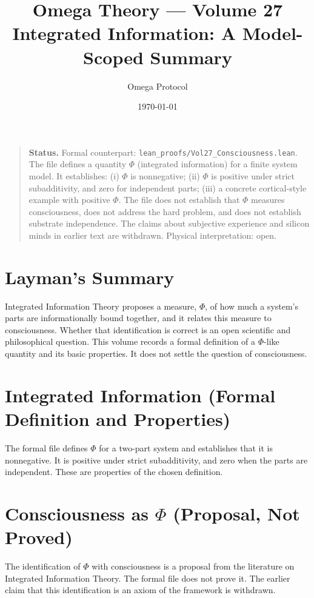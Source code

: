 \documentclass[11pt, a4paper]{article}
\title{Omega Theory --- Volume 27\\\Large Integrated Information: A Model-Scoped Summary}
\author{Omega Protocol}
\date{\today}
\begin{document}
\maketitle

\begin{quote}
\textbf{Status.} Formal counterpart: \texttt{lean\_proofs/Vol27\_Consciousness.lean}. The file defines a quantity $\Phi$ (integrated information) for a finite system model. It establishes: (i) $\Phi$ is nonnegative; (ii) $\Phi$ is positive under strict subadditivity, and zero for independent parts; (iii) a concrete cortical-style example with positive $\Phi$. The file does not establish that $\Phi$ measures consciousness, does not address the hard problem, and does not establish substrate independence. The claims about subjective experience and silicon minds in earlier text are withdrawn. Physical interpretation: open.
\end{quote}

\section*{Layman's Summary}
Integrated Information Theory proposes a measure, $\Phi$, of how much a system's parts are informationally bound together, and it relates this measure to consciousness. Whether that identification is correct is an open scientific and philosophical question. This volume records a formal definition of a $\Phi$-like quantity and its basic properties. It does not settle the question of consciousness.

\section{Integrated Information (Formal Definition and Properties)}
The formal file defines $\Phi$ for a two-part system and establishes that it is nonnegative. It is positive under strict subadditivity, and zero when the parts are independent. These are properties of the chosen definition.

\section{Consciousness as $\Phi$ (Proposal, Not Proved)}
The identification of $\Phi$ with consciousness is a proposal from the literature on Integrated Information Theory. The formal file does not prove it. The earlier claim that this identification is an axiom of the framework is withdrawn.
\end{document}
